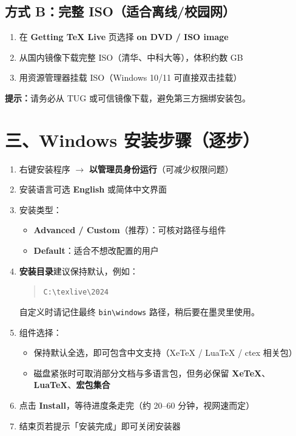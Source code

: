 \documentclass[UTF8,11pt]{article}
\begin{document}
\subsection*{方式 B：完整 ISO（适合离线/校园网）}
\begin{enumerate}
  \item 在 \textbf{Getting TeX Live} 页选择 \textbf{on DVD / ISO image}
  \item 从国内镜像下载完整 ISO（清华、中科大等），体积约数 GB
  \item 用资源管理器挂载 ISO（Windows 10/11 可直接双击挂载）
\end{enumerate}

\textcolor{warn}{\textbf{提示：}请务必从 TUG 或可信镜像下载，避免第三方捆绑安装包。}

\section*{三、Windows 安装步骤（逐步）}

\begin{enumerate}
  \item 右键安装程序 $\rightarrow$ \textbf{以管理员身份运行}（可减少权限问题）
  \item 安装语言可选 \textbf{English} 或简体中文界面
  \item 安装类型：
    \begin{itemize}
      \item \textbf{Advanced / Custom}（推荐）：可核对路径与组件
      \item \textbf{Default}：适合不想改配置的用户
    \end{itemize}
  \item \textbf{安装目录}建议保持默认，例如：
    \begin{quote}
      \texttt{C:\textbackslash texlive\textbackslash 2024}
    \end{quote}
    自定义时请记住最终 \texttt{bin\textbackslash windows} 路径，稍后要在墨灵里使用。
  \item 组件选择：
    \begin{itemize}
      \item 保持默认全选，即可包含中文支持（XeTeX / LuaTeX / ctex 相关包）
      \item 磁盘紧张时可取消部分文档与多语言包，但务必保留 \textbf{XeTeX}、\textbf{LuaTeX}、\textbf{宏包集合}
    \end{itemize}
  \item 点击 \textbf{Install}，等待进度条走完（约 20--60 分钟，视网速而定）
  \item 结束页若提示「安装完成」即可关闭安装器
\end{enumerate}
\end{document}
